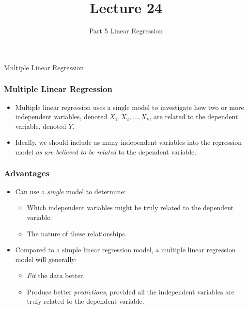 \documentclass[14pt]{beamer}
\title[ECON2843]{Lecture 24}
\subtitle{Part 5 Linear Regression}
\date{}
\begin{document}
	\begin{frame}
		\titlepage
		
	\end{frame}
	\begin{frame}
		\vspace{1cm}
		\centering
		{\color{blue}\large Multiple Linear Regression}
	\end{frame}
	
	


\begin{frame}
	\frametitle{Multiple Linear Regression}
	
	\begin{itemize}[label={\color{blue}$\blacktriangleright$}]
		\item Multiple linear regression uses a single model to investigate how two or more independent variables, denoted $X_1, X_2, \dots, X_k$, are related to the dependent variable, denoted $Y$.
		
		\item Ideally, we should include as many independent variables into the regression model \textit{as are believed to be related} to the dependent variable.
	\end{itemize}
	
\end{frame}
\begin{frame}
	\frametitle{Advantages}
	
	\begin{itemize}[label={\color{blue}$\blacktriangleright$}]
		\item Can use a \textit{single} model to determine:
		\begin{itemize}[label={\color{blue}$\blacktriangleright$}]
			\item Which independent variables might be truly related to the dependent variable.
			\item The nature of these relationships.
		\end{itemize}
		
		\item Compared to a simple linear regression model, a multiple linear regression model will generally:
		\begin{itemize}[label={\color{blue}$\blacktriangleright$}]
			\item \textit{Fit} the data better.
			\item Produce better \textit{predictions}, provided all the independent variables are truly related to the dependent variable.
		\end{itemize}
	\end{itemize}
	
\end{frame}
\end{document}
